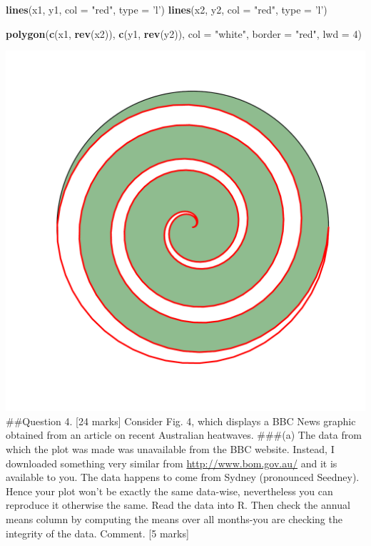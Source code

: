 \documentclass[]{article}
\newenvironment{Shaded}{\begin{snugshade}}{\end{snugshade}}
\newcommand{\KeywordTok}[1]{\textcolor[rgb]{0.13,0.29,0.53}{\textbf{#1}}}
\newcommand{\DataTypeTok}[1]{\textcolor[rgb]{0.13,0.29,0.53}{#1}}
\newcommand{\DecValTok}[1]{\textcolor[rgb]{0.00,0.00,0.81}{#1}}
\newcommand{\StringTok}[1]{\textcolor[rgb]{0.31,0.60,0.02}{#1}}
\newcommand{\NormalTok}[1]{#1}
\begin{document}
\begin{Shaded}
\begin{Highlighting}[]
\KeywordTok{lines}\NormalTok{(x1, y1, }\DataTypeTok{col =} \StringTok{"red"}\NormalTok{, }\DataTypeTok{type =} \StringTok{'l'}\NormalTok{)}
\KeywordTok{lines}\NormalTok{(x2, y2, }\DataTypeTok{col =} \StringTok{"red"}\NormalTok{, }\DataTypeTok{type =} \StringTok{'l'}\NormalTok{)}

\KeywordTok{polygon}\NormalTok{(}\KeywordTok{c}\NormalTok{(x1, }\KeywordTok{rev}\NormalTok{(x2)), }\KeywordTok{c}\NormalTok{(y1, }\KeywordTok{rev}\NormalTok{(y2)), }\DataTypeTok{col =} \StringTok{"white"}\NormalTok{, }\DataTypeTok{border =} \StringTok{"red"}\NormalTok{, }\DataTypeTok{lwd =} \DecValTok{4}\NormalTok{)}
\end{Highlighting}
\end{Shaded}

\includegraphics{Assignment3_files/figure-latex/unnamed-chunk-4-1.pdf}
\#\#Question 4. {[}24 marks{]} Consider Fig. 4, which displays a BBC
News graphic obtained from an article on recent Australian heatwaves.
\#\#\#(a) The data from which the plot was made was unavailable from the
BBC website. Instead, I downloaded something very similar from
\url{http://www.bom.gov.au/} and it is available to you. The data
happens to come from Sydney (pronounced Seedney). Hence your plot won't
be exactly the same data-wise, nevertheless you can reproduce it
otherwise the same. Read the data into R. Then check the annual means
column by computing the means over all months-you are checking the
integrity of the data. Comment. {[}5 marks{]}
\end{document}
